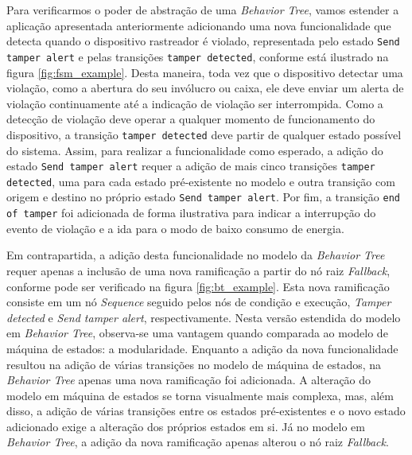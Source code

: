 \documentclass[conference]{IEEEtran}
\begin{document}
Para verificarmos o poder de abstração de uma \textit{Behavior Tree}, vamos estender a aplicação apresentada anteriormente adicionando uma nova funcionalidade que detecta quando o dispositivo rastreador é violado, representada pelo estado \texttt{Send tamper alert} e pelas transições \texttt{tamper detected}, conforme está ilustrado na figura \ref{fig:fsm_example}. Desta maneira, toda vez que o dispositivo detectar uma violação, como a abertura do seu invólucro ou caixa, ele deve enviar um alerta de violação continuamente até a indicação de violação ser interrompida. Como a detecção de violação deve operar a qualquer momento de funcionamento do dispositivo, a transição \texttt{tamper detected} deve partir de qualquer estado possível do sistema. Assim, para realizar a funcionalidade como esperado, a adição do estado \texttt{Send tamper alert} requer a adição de mais cinco transições \texttt{tamper detected}, uma para cada estado pré-existente no modelo e outra transição com origem e destino no próprio estado \texttt{Send tamper alert}. Por fim, a transição \texttt{end of tamper} foi adicionada de forma ilustrativa para indicar a interrupção do evento de violação e a ida para o modo de baixo consumo de energia.

Em contrapartida, a adição desta funcionalidade no modelo da \textit{Behavior Tree} requer apenas a inclusão de uma nova ramificação a partir do nó raiz \textit{Fallback}, conforme pode ser verificado na figura \ref{fig:bt_example}. Esta nova ramificação consiste em um nó \textit{Sequence} seguido pelos nós de condição e execução, \textit{Tamper detected} e \textit{Send tamper alert}, respectivamente. Nesta versão estendida do modelo em \textit{Behavior Tree}, observa-se uma vantagem quando comparada ao modelo de máquina de estados: a modularidade. Enquanto a adição da nova funcionalidade resultou na adição de várias transições no modelo de máquina de estados, na \textit{Behavior Tree} apenas uma nova ramificação foi adicionada. A alteração do modelo em máquina de estados se torna visualmente mais complexa, mas, além disso, a adição de várias transições entre os estados pré-existentes e o novo estado adicionado exige a alteração dos próprios estados em si. Já no modelo em \textit{Behavior Tree}, a adição da nova ramificação apenas alterou o nó raiz \textit{Fallback}. 
\end{document}

